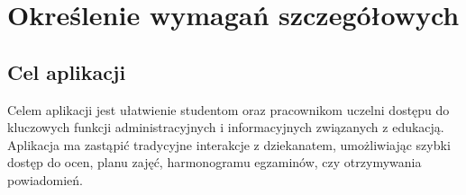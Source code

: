 \newpage
\section{Określenie wymagań szczegółowych}		%

\subsection{Cel aplikacji}
Celem aplikacji jest ułatwienie studentom oraz pracownikom uczelni dostępu do kluczowych funkcji administracyjnych i informacyjnych związanych z edukacją. Aplikacja ma zastąpić tradycyjne interakcje z dziekanatem, umożliwiając szybki dostęp do ocen, planu zajęć, harmonogramu egzaminów, czy otrzymywania powiadomień.

